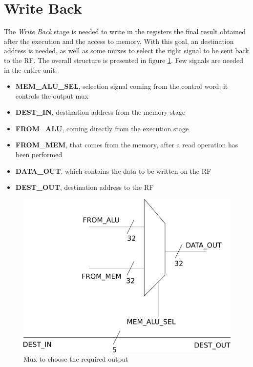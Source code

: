 \section{Write Back}
\label{chap_wb}


The \textit{Write Back} stage is needed to write in the registers the final result obtained after the execution and the access to memory. With this goal, an destination address is needed, as well as some muxes to select the right signal to be sent back to the \textsf{RF}. The overall structure is presented in figure \ref{wb_overall_fig}.
Few signals are needed in the entire unit:
\begin{itemize}
	\item \textbf{MEM\_ALU\_SEL}, selection signal coming from the control 
	word, it controls the output mux
	\item \textbf{DEST\_IN}, destination address from the memory stage
	\item \textbf{FROM\_ALU}, coming directly from the execution stage
	\item \textbf{FROM\_MEM}, that comes from the memory, after a read operation has been performed
	\item \textbf{DATA\_OUT}, which contains the data to be written on the 
	\textsf{RF}
	\item \textbf{DEST\_OUT}, destination address to the \textsf{RF}
\end{itemize}

\begin{figure}
	\centering
	\includegraphics[scale=0.5]{chapters/figures/wb_stage}
	\caption{Mux to choose the required output}
	\label{wb_overall_fig}
\end{figure} 


